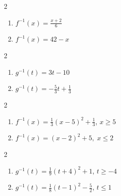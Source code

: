 \documentclass{ximera}
\begin{document}
	\author{Stitz-Zeager}


\label{ExercisesforInverseFunctions}




\begin{multicols}{2}
\begin{enumerate}
\addtocounter{enumi}{8}

\item $f^{-1}(x) = \frac{x + 2}{6}$
\item $f^{-1}(x) = 42-x$

\setcounter{HW}{\value{enumi}}
\end{enumerate}
\end{multicols}

\begin{multicols}{2}
\begin{enumerate}
\setcounter{enumi}{\value{HW}}

\item  $g^{-1}(t) = 3t-10$
\item $g^{-1}(t)  = -\frac{5}{3} t + \frac{1}{3}$


\setcounter{HW}{\value{enumi}}
\end{enumerate}
\end{multicols}

\begin{multicols}{2}
\begin{enumerate}
\setcounter{enumi}{\value{HW}}


\item $f^{-1}(x) = \frac{1}{3}(x-5)^2+\frac{1}{3}$, $x \geq 5$
\item $f^{-1}(x) = (x - 2)^{2} + 5, \; x \leq 2$

\setcounter{HW}{\value{enumi}}
\end{enumerate}
\end{multicols}

\begin{multicols}{2}
\begin{enumerate}
\setcounter{enumi}{\value{HW}}


\item $g^{-1}(t) = \frac{1}{9}(t+4)^2+1$, $t \geq -4$

\item $g^{-1}(t) = \frac{1}{8}(t-1)^2-\frac{5}{2}$, $t \leq 1$

\setcounter{HW}{\value{enumi}}
\end{enumerate}
\end{multicols}
\end{document}
